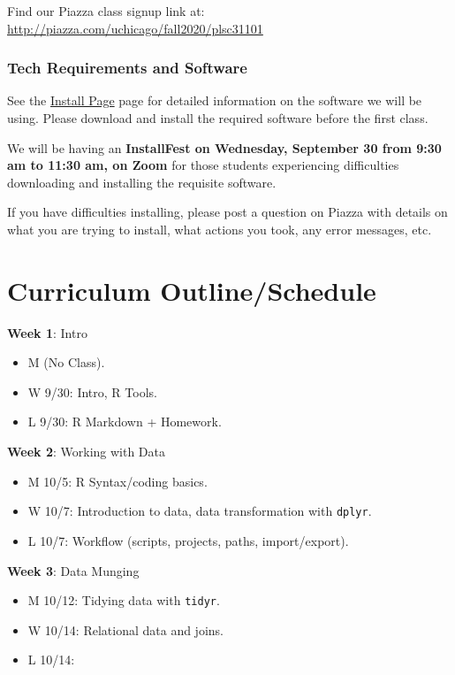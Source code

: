 \documentclass[]{book}
\providecommand{\tightlist}{%
  \setlength{\itemsep}{0pt}\setlength{\parskip}{0pt}}
\begin{document}
Find our Piazza class signup link at:
\url{http://piazza.com/uchicago/fall2020/plsc31101}

\subsubsection*{Tech Requirements and
Software}\label{tech-requirements-and-software}

See the \href{installation}{Install Page} page for detailed information
on the software we will be using. Please download and install the
required software before the first class.

We will be having an \textbf{InstallFest on Wednesday, September 30 from
9:30 am to 11:30 am, on Zoom} for those students experiencing
difficulties downloading and installing the requisite software.

If you have difficulties installing, please post a question on Piazza
with details on what you are trying to install, what actions you took,
any error messages, etc.

\section{Curriculum Outline/Schedule}\label{curriculum-outlineschedule}

\textbf{Week 1}: Intro

\begin{itemize}
\tightlist
\item
  M (No Class).
\item
  W 9/30: Intro, R Tools.
\item
  L 9/30: R Markdown + Homework.
\end{itemize}

\textbf{Week 2}: Working with Data

\begin{itemize}
\tightlist
\item
  M 10/5: R Syntax/coding basics.
\item
  W 10/7: Introduction to data, data transformation with \texttt{dplyr}.
\item
  L 10/7: Workflow (scripts, projects, paths, import/export).
\end{itemize}

\textbf{Week 3}: Data Munging

\begin{itemize}
\tightlist
\item
  M 10/12: Tidying data with \texttt{tidyr}.
\item
  W 10/14: Relational data and joins.
\item
  L 10/14:
\end{itemize}
\end{document}
